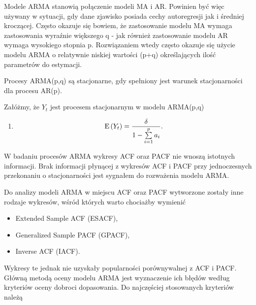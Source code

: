 \documentclass[10pt,a4paper]{book}
\begin{document}
\begin{remark}
Modele ARMA stanowią połączenie modeli MA i AR. Powinien być więc używany w sytuacji, gdy dane zjawisko posiada cechy autoregresji jak i średniej kroczącej. Często okazuje się bowiem, że zastosowanie modelu MA wymaga zastosowania wyraźnie większego q - jak również zastosowanie modelu AR wymaga wysokiego stopnia p. Rozwiązaniem wtedy często okazuje się użycie modelu ARMA o relatywnie niskiej wartości (p+q) określających ilość parametrów do estymacji.
\end{remark}

\begin{remark}
Procesy ARMA(p,q) są stacjonarne, gdy spełniony jest warunek stacjonarności dla procesu AR(p).
\end{remark}

\begin{proposition}
Załóżmy, że $Y_t$ jest procesem stacjonarnym w modelu ARMA(p,q)
\begin{enumerate}
\item 
$$
\Ex{Y_t} = \frac{\delta}{1	- \sum_{i=1}^{p} a_i}.
$$
\end{enumerate}
\end{proposition}

\begin{remark}
W badaniu procesów ARMA wykresy ACF oraz PACF nie wnoszą istotnych informacji. Brak informacji płynącej z wykresów ACF i PACF przy jednoczesnych przekonaniu o stacjonarności jest sygnałem do rozważenia modelu ARMA.
\end{remark}

Do analizy modeli ARMA w miejscu ACF oraz PACF wytworzone zostały inne rodzaje wykresów, wśród których warto chociażby wymienić

\begin{itemize}
\item Extended Sample ACF (ESACF), 
\item Generalized Sample PACF (GPACF),
\item Inverse ACF (IACF).
\end{itemize}

Wykresy te jednak nie uzyskały popularności porównywalnej z ACF i PACF. Główną metodą oceny modelu ARMA jest wyznaczenie ich błędów według kryteriów oceny dobroci dopasowania. Do najczęściej stosowanych kryteriów należą 
\end{document}
